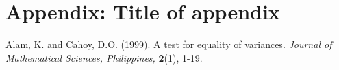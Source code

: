 \documentclass{BGSU}
\numberwithin{equation}{chapter}
\begin{document}
\backmatter

\mbox{}\newpage
\appendix
\chapter{Appendix: Title of appendix}


\mbox{}\newpage\mbox{}
\begin{thebibliography}{99}

\bibitem{} Alam, K. and Cahoy, D.O. (1999). A test for equality of
variances. \textit{Journal of Mathematical Sciences, Philippines,} {\bf{2}}(1), 1-19.

\end{thebibliography}
\end{document}
